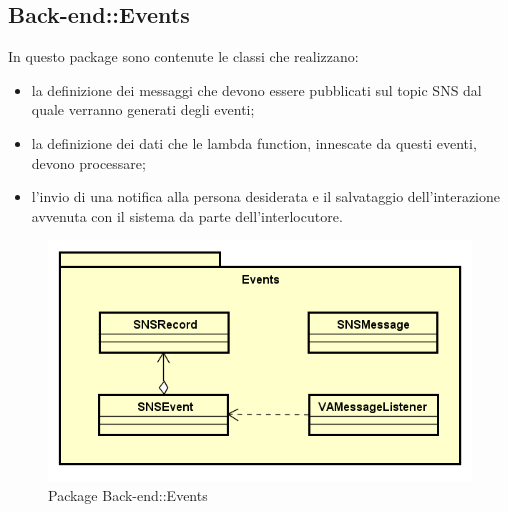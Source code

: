 \subsection{Back-end::Events}
In questo package sono contenute le classi che realizzano: \begin{itemize} \item la definizione dei messaggi che devono essere pubblicati sul topic SNS dal quale verranno generati degli eventi; \item la definizione dei dati che le lambda function, innescate da questi eventi, devono processare; \item l'invio di una notifica alla persona desiderata e il salvataggio dell'interazione avvenuta con il sistema da parte dell'interlocutore. \end{itemize}
\begin{figure}[h] \centering \includegraphics[width=\textwidth,height=\textheight,keepaspectratio]{images/diagrams/back-end/Official_Backend_0304/Events.png}
	\caption{Package Back-end::Events}
\end{figure}
\newpage

